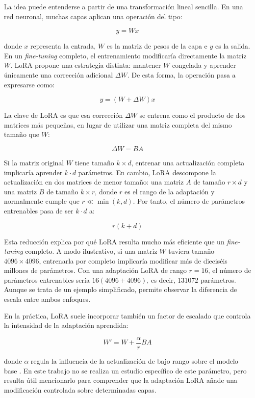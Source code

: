 \documentclass[a4paper,11pt,titlepage]{scrbook}
\begin{document}
\medskip

La idea puede entenderse a partir de una transformación lineal sencilla. En una red neuronal, muchas capas aplican una operación del tipo:

\[
y = Wx
\]

donde \(x\) representa la entrada, \(W\) es la matriz de pesos de la capa e \(y\) es la salida. En un \textit{fine-tuning} completo, el entrenamiento modificaría directamente la matriz \(W\). LoRA propone una estrategia distinta: mantener \(W\) congelada y aprender únicamente una corrección adicional \(\Delta W\). De esta forma, la operación pasa a expresarse como:

\[
y = (W + \Delta W)x
\]

\medskip

La clave de LoRA es que esa corrección \(\Delta W\) se entrena como el producto de dos matrices más pequeñas, en lugar de utilizar una matriz completa del mismo tamaño que \(W\):

\[
\Delta W = BA
\]

Si la matriz original \(W\) tiene tamaño \(k \times d\), entrenar una actualización completa implicaría aprender \(k \cdot d\) parámetros. En cambio, LoRA descompone la actualización en dos matrices de menor tamaño: una matriz \(A\) de tamaño \(r \times d\) y una matriz \(B\) de tamaño \(k \times r\), donde \(r\) es el rango de la adaptación y normalmente cumple que \(r \ll \min(k,d)\). Por tanto, el número de parámetros entrenables pasa de ser \(k \cdot d\) a:

\[
r(k+d)
\]

\medskip

Esta reducción explica por qué LoRA resulta mucho más eficiente que un \textit{fine-tuning} completo. A modo ilustrativo, si una matriz \(W\) tuviera tamaño \(4096 \times 4096\), entrenarla por completo implicaría modificar más de dieciséis millones de parámetros. Con una adaptación LoRA de rango \(r = 16\), el número de parámetros entrenables sería \(16(4096+4096)\), es decir, 131072 parámetros. Aunque se trata de un ejemplo simplificado, permite observar la diferencia de escala entre ambos enfoques.

\medskip

En la práctica, LoRA suele incorporar también un factor de escalado que controla la intensidad de la adaptación aprendida:

\[
W' = W + \frac{\alpha}{r}BA
\]

donde \(\alpha\) regula la influencia de la actualización de bajo rango sobre el modelo base \cite{hu2022lora}. En este trabajo no se realiza un estudio específico de este parámetro, pero resulta útil mencionarlo para comprender que la adaptación LoRA añade una modificación controlada sobre determinadas capas.
\end{document}
